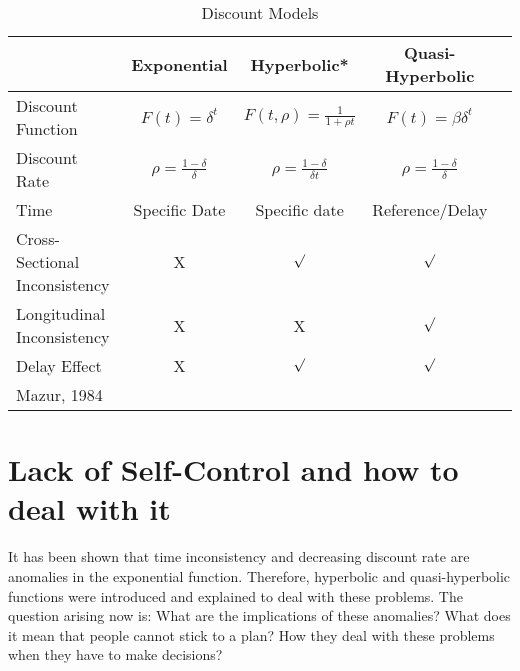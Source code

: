 \documentclass[]{article}
\begin{document}
\begin{table}
    \caption {Discount Models} \label{tab:dis}
    \centering
    \begin{tabular}{l c c c c}
        \hline
                          & Exponential                    & Hyperbolic*                         & Quasi-Hyperbolic \\ 
        \hline
        Discount Function & $F(t)= \delta^t$               & $F(t, \rho)= \frac{1}{1 + \rho t}$  & $F(t)=\beta \delta^t$ \\ 
        Discount Rate     & $\rho=\frac{1-\delta}{\delta}$ & $\rho=\frac{1-\delta}{\delta t}$    & $\rho=\frac{1-\delta}{\delta}$ \\ 
        Time              & Specific Date                  & Specific date                       & Reference/Delay  \\ 
        Cross-Sectional Inconsistency & X                  & $\surd$                             & $\surd$ \\ 
        Longitudinal Inconsistency    & X                  & X                                   & $\surd$ \\ 
        Delay Effect                  & X                  & $\surd$                             & $\surd$ \\ 
        \hline
        \begin{minipage}{0.2\textwidth}
            {\footnotesize * Mazur, 1984}
        \end{minipage}
    \end{tabular}
\end{table}

\hypertarget{lack-of-self-control-and-how-to-deal-with-it}{%
\section{Lack of Self-Control and how to deal with it}\label{lack-of-self-control-and-how-to-deal-with-it}}

It has been shown that time inconsistency and decreasing discount rate are anomalies in the exponential function. Therefore, hyperbolic and quasi-hyperbolic functions were introduced and explained to deal with these problems. The question arising now is: What are the implications of these anomalies? What does it mean that people cannot stick to a plan? How they deal with these problems when they have to make decisions?
\end{document}

